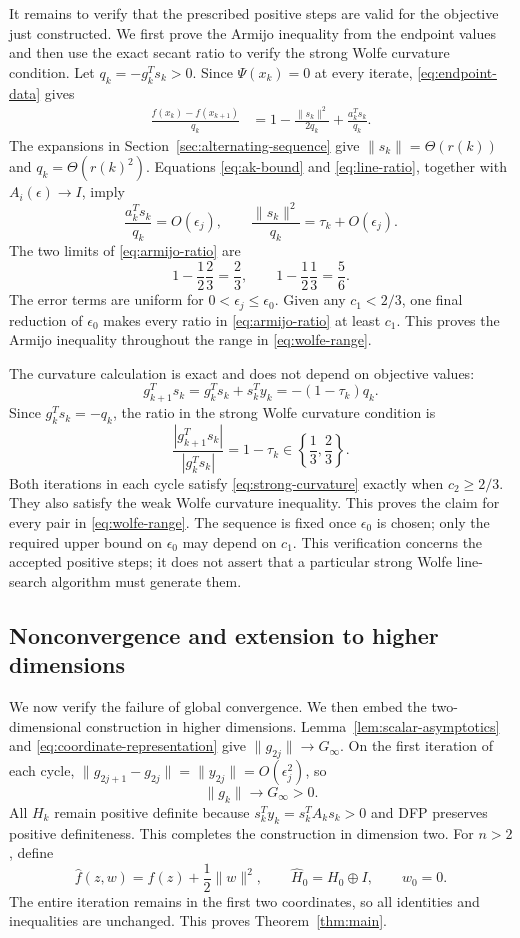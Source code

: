 \documentclass[11pt]{article}
\begin{document}
It remains to verify that the prescribed positive steps are valid for the
objective just constructed.  We first prove the Armijo inequality
from the endpoint values and then use the exact secant ratio to verify the
strong Wolfe curvature condition.  Let $q_k=-g_k^Ts_k>0$.  Since
$\Psi(x_k)=0$ at every iterate,
\eqref{eq:endpoint-data} gives
\begin{align}
\frac{f(x_k)-f(x_{k+1})}{q_k}
&=1-\frac{\|s_k\|^2}{2q_k}
+\frac{a_k^Ts_k}{q_k}.
\label{eq:armijo-ratio}
\end{align}
The expansions in Section~\ref{sec:alternating-sequence} give
$\|s_k\|=\Theta(r(k))$ and
$q_k=\Theta(r(k)^2)$.  Equations \eqref{eq:ak-bound} and
\eqref{eq:line-ratio}, together with $A_i(\epsilon)\to I$, imply
\[
\frac{a_k^Ts_k}{q_k}=O(\epsilon_j),
\qquad
\frac{\|s_k\|^2}{q_k}=\tau_k+O(\epsilon_j).
\]
The two limits of \eqref{eq:armijo-ratio} are
\[
1-\frac12\frac23=\frac23,
\qquad
1-\frac12\frac13=\frac56.
\]
The error terms are uniform for $0<\epsilon_j\le\epsilon_0$.  Given any
$c_1<2/3$, one final reduction of $\epsilon_0$ makes every ratio in
\eqref{eq:armijo-ratio} at least $c_1$.  This proves the Armijo inequality
throughout the range in \eqref{eq:wolfe-range}.

The curvature calculation is exact and does not depend on objective values:
\[
g_{k+1}^Ts_k=g_k^Ts_k+s_k^Ty_k
=-(1-\tau_k)q_k.
\]
Since $g_k^Ts_k=-q_k$, the ratio in the strong Wolfe curvature condition is
\[
\frac{|g_{k+1}^Ts_k|}{|g_k^Ts_k|}=1-\tau_k
\in\left\{\frac13,\frac23\right\}.
\]
Both iterations in each cycle satisfy \eqref{eq:strong-curvature} exactly when
$c_2\ge2/3$.  They also satisfy the weak Wolfe curvature inequality.  This
proves the claim for every pair in \eqref{eq:wolfe-range}.  The sequence is fixed once
$\epsilon_0$ is chosen; only the required upper bound on $\epsilon_0$ may
depend on $c_1$.  This verification concerns the accepted positive steps; it
does not assert that a particular strong Wolfe line-search algorithm must
generate them.

\subsection{Nonconvergence and extension to higher dimensions}

We now verify the failure of global convergence.  We then embed the
two-dimensional construction in higher dimensions.
Lemma~\ref{lem:scalar-asymptotics} and
\eqref{eq:coordinate-representation} give $\|g_{2j}\|\to G_\infty$.  On the
first iteration of each cycle,
$\|g_{2j+1}-g_{2j}\|=\|y_{2j}\|=O(\epsilon_j^2)$, so
\[
\|g_k\|\longrightarrow G_\infty>0.
\]
All $H_k$ remain positive definite because $s_k^Ty_k=s_k^TA_ks_k>0$ and
DFP preserves positive definiteness.  This completes the construction in
dimension two.  For $n>2$, define
\[
\widehat f(z,w)=f(z)+\frac12\|w\|^2,
\qquad
\widehat H_0=H_0\oplus I,
\qquad w_0=0.
\]
The entire iteration remains in the first two coordinates, so all identities
and inequalities are unchanged.  This proves Theorem~\ref{thm:main}.
\end{document}
